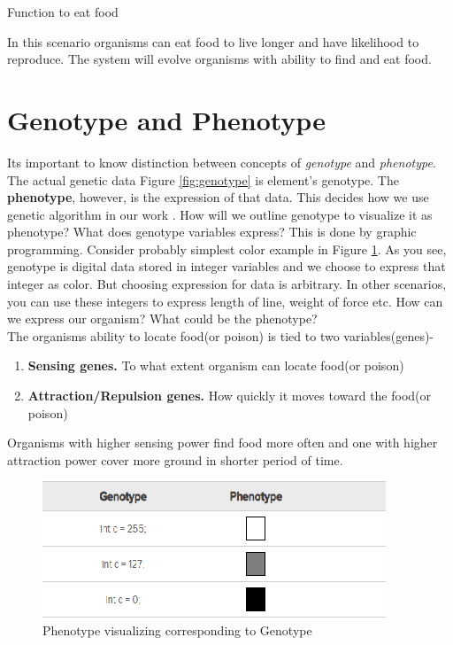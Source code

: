 \documentclass[conference]{IEEEtran}
\begin{document}
\begin{algorithm}
\caption{Function to eat food}
\begin{algorithmic} 
\ENDIF
\ENDFOR
\end{algorithmic}
\end{algorithm}
In this scenario organisms can eat food to live longer and have likelihood to reproduce. The system will evolve organisms with ability to find and eat food.

\section{Genotype and Phenotype}
Its important to know distinction between concepts of \textit{genotype} and \textit{phenotype}. The actual genetic data Figure \ref{fig:genotype} is element's genotype. The \textbf{phenotype}, however, is the expression of that data. This decides how we use genetic algorithm in our work \cite{mapping-genotype-phenotype}. How will we outline genotype to visualize it as phenotype? What does genotype variables express? This is done by graphic programming. Consider probably simplest color example in Figure \ref{fig:genotype-and-phenotype}. As you see, genotype is digital data stored in integer variables and we choose to express that integer as color. But choosing expression for data is arbitrary. In other scenarios, you can use these integers to express length of line, weight of force etc. How can we express our organism? What could be the phenotype?\\
The organisms ability to locate food(or poison) is tied to two variables(genes)-
\begin{enumerate}
\item \textbf{Sensing genes.} To what extent organism can locate food(or poison)
\item \textbf{Attraction/Repulsion genes.} How quickly it moves toward the food(or poison)
\end{enumerate}
Organisms with higher sensing power find food more often and one with higher attraction power cover more ground in shorter period of time.
\begin{figure}
	\includegraphics[scale=1]{genotype-and-phenotype.png}
	\caption{Phenotype visualizing corresponding to Genotype}
	\label{fig:genotype-and-phenotype}
\end{figure}
\end{document}
